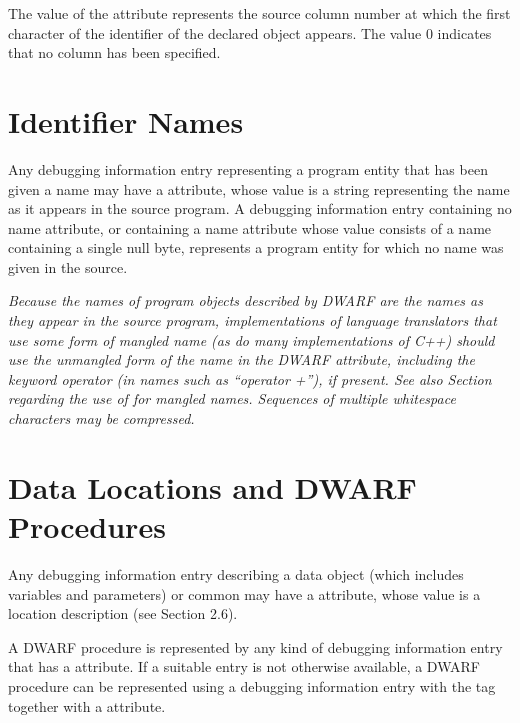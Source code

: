 The value of the  attribute represents
the source column number at which the first character of
the identifier of the declared object appears. The value 0
indicates that no column has been specified.

\section{Identifier Names}
\label{chap:identifiernames}
Any debugging information entry representing a program entity
that has been given a name may have a  attribute,
whose value is a string representing the name as it appears in
the source program. A debugging information entry containing
no name attribute, or containing a name attribute whose value
consists of a name containing a single null byte, represents
a program entity for which no name was given in the source.

\textit{Because the names of program objects described by DWARF are the
names as they appear in the source program, implementations
of language translators that use some form of mangled name
(as do many implementations of C++) should use the unmangled
form of the name in the DWARF  attribute,
including the keyword operator (in names such as “operator
+”), if present. See also 
Section  regarding the use
of  for mangled names. Sequences of
multiple whitespace characters may be compressed.}

\section{Data Locations and DWARF Procedures}
Any debugging information entry describing a data object (which
includes variables and parameters) or common  may have a
 attribute, whose value is a location description
(see Section 2.6).  

A DWARF procedure is represented by any
kind of debugging information entry that has a 
attribute. If a suitable entry is not otherwise available,
a DWARF procedure can be represented using a debugging
information entry with the 
tag 
together with a  attribute.  

